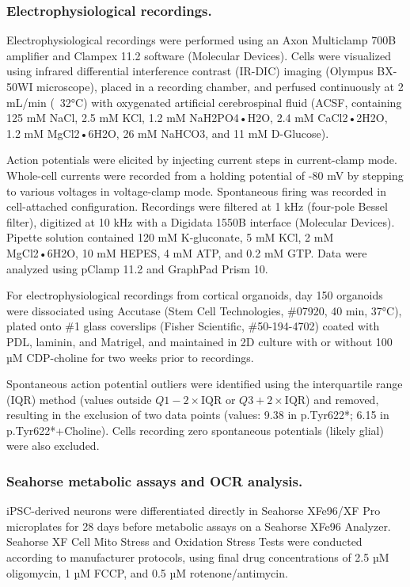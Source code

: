 \subsubsection{Electrophysiological recordings.}
Electrophysiological recordings were performed using an Axon Multiclamp 700B amplifier and Clampex 11.2 software (Molecular Devices). Cells were visualized using infrared differential interference contrast (IR-DIC) imaging (Olympus BX-50WI microscope), placed in a recording chamber, and perfused continuously at 2 mL/min (~32°C) with oxygenated artificial cerebrospinal fluid (ACSF, containing 125 mM NaCl, 2.5 mM KCl, 1.2 mM NaH2PO4•H2O, 2.4 mM CaCl2•2H2O, 1.2 mM MgCl2•6H2O, 26 mM NaHCO3, and 11 mM D-Glucose).

Action potentials were elicited by injecting current steps in current-clamp mode. Whole-cell currents were recorded from a holding potential of -80 mV by stepping to various voltages in voltage-clamp mode. Spontaneous firing was recorded in cell-attached configuration. Recordings were filtered at 1 kHz (four-pole Bessel filter), digitized at 10 kHz with a Digidata 1550B interface (Molecular Devices). Pipette solution contained 120 mM K-gluconate, 5 mM KCl, 2 mM MgCl2•6H2O, 10 mM HEPES, 4 mM ATP, and 0.2 mM GTP. Data were analyzed using pClamp 11.2 and GraphPad Prism 10.

For electrophysiological recordings from cortical organoids, day 150 organoids were dissociated using Accutase (Stem Cell Technologies, \#07920, 40 min, 37°C), plated onto \#1 glass coverslips (Fisher Scientific, \#50-194-4702) coated with PDL, laminin, and Matrigel, and maintained in 2D culture with or without 100 µM CDP-choline for two weeks prior to recordings. 

Spontaneous action potential outliers were identified using the interquartile range (IQR) method (values outside \( Q1 - 2 \times \mathrm{IQR} \) or \( Q3 + 2 \times \mathrm{IQR} \)) and removed, resulting in the exclusion of two data points (values: 9.38 in p.Tyr622*; 6.15 in p.Tyr622*+Choline). Cells recording zero spontaneous potentials (likely glial) were also excluded.

\subsubsection{Seahorse metabolic assays and OCR analysis.}
iPSC-derived neurons were differentiated directly in Seahorse XFe96/XF Pro microplates for 28 days before metabolic assays on a Seahorse XFe96 Analyzer. Seahorse XF Cell Mito Stress and Oxidation Stress Tests were conducted according to manufacturer protocols, using final drug concentrations of 2.5 µM oligomycin, 1 µM FCCP, and 0.5 µM rotenone/antimycin.

